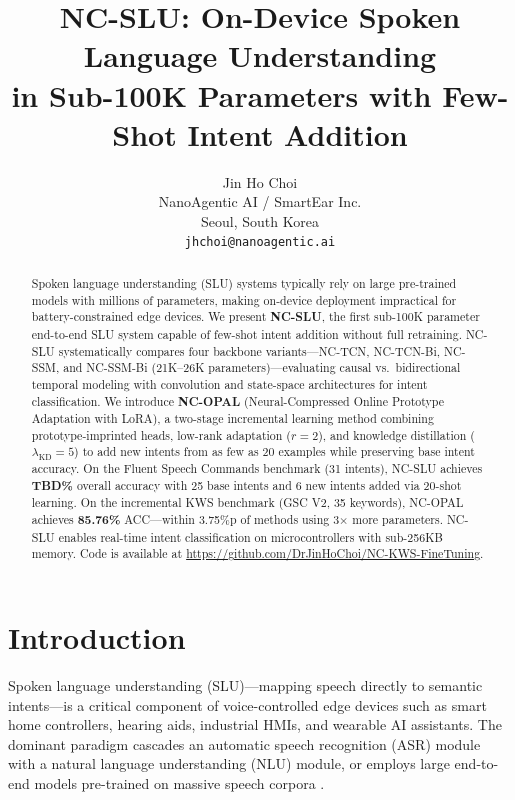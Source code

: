 \documentclass[11pt]{article}
\title{NC-SLU: On-Device Spoken Language Understanding \\ in Sub-100K Parameters with Few-Shot Intent Addition}
\author{Jin Ho Choi \\
  NanoAgentic AI / SmartEar Inc. \\
  Seoul, South Korea \\
  \texttt{jhchoi@nanoagentic.ai}}
\begin{document}
\maketitle

\begin{abstract}
Spoken language understanding (SLU) systems typically rely on large pre-trained models with millions of parameters, making on-device deployment impractical for battery-constrained edge devices.
We present \textbf{NC-SLU}, the first sub-100K parameter end-to-end SLU system capable of few-shot intent addition without full retraining.
NC-SLU systematically compares four backbone variants---NC-TCN, NC-TCN-Bi, NC-SSM, and NC-SSM-Bi (21K--26K parameters)---evaluating causal vs.\ bidirectional temporal modeling with convolution and state-space architectures for intent classification.
We introduce \textbf{NC-OPAL} (Neural-Compressed Online Prototype Adaptation with LoRA), a two-stage incremental learning method combining prototype-imprinted heads, low-rank adaptation ($r{=}2$), and knowledge distillation ($\lambda_{\text{KD}}{=}5$) to add new intents from as few as 20 examples while preserving base intent accuracy.
On the Fluent Speech Commands benchmark (31 intents), NC-SLU achieves \textbf{TBD\%} overall accuracy with 25 base intents and 6 new intents added via 20-shot learning.
On the incremental KWS benchmark (GSC V2, 35 keywords), NC-OPAL achieves \textbf{85.76\%} ACC---within 3.75\%p of methods using 3$\times$ more parameters.
NC-SLU enables real-time intent classification on microcontrollers with sub-256KB memory.
Code is available at \url{https://github.com/DrJinHoChoi/NC-KWS-FineTuning}.
\end{abstract}

\section{Introduction}

Spoken language understanding (SLU)---mapping speech directly to semantic intents---is a critical component of voice-controlled edge devices such as smart home controllers, hearing aids, industrial HMIs, and wearable AI assistants.
The dominant paradigm cascades an automatic speech recognition (ASR) module with a natural language understanding (NLU) module, or employs large end-to-end models pre-trained on massive speech corpora \cite{lugosch2019speech,arora2023espnetslu,radford2023whisper}.
\end{document}
